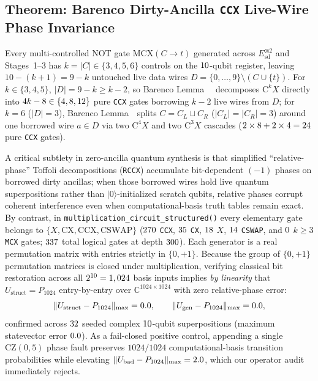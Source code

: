 \documentclass[aps,prx,twocolumn,superscriptaddress,nofootinbib]{revtex4-2}
\begin{document}
\subsection{Theorem: Barenco Dirty-Ancilla \texttt{CCX} Live-Wire Phase Invariance}
Every multi-controlled NOT gate $\mathrm{MCX}(C \to t)$ generated across $E_{\mathrm{sd}}^{\otimes 2}$ and Stages~1--3 has $k = |C| \in \{3,4,5,6\}$ controls on the $10$-qubit register, leaving $10 - (k + 1) = 9 - k$ untouched live data wires $D = \{0,\dots,9\} \setminus (C \cup \{t\})$. For $k \in \{3,4,5\}$, $|D| = 9 - k \ge k - 2$, so Barenco Lemma~\btmBarencoLemmaSevenTwo~\cite{Barenco1995} decomposes $\mathrm{C}^k X$ directly into $4k - 8 \in \{4, 8, 12\}$ pure \texttt{CCX} gates borrowing $k - 2$ live wires from $D$; for $k = 6$ ($|D| = 3$), Barenco Lemma~\btmBarencoLemmaSevenThree\ splits $C = C_L \sqcup C_R$ ($|C_L| = |C_R| = 3$) around one borrowed wire $a \in D$ via two $\mathrm{C}^4 X$ and two $\mathrm{C}^3 X$ cascades ($2 \times 8 + 2 \times 4 = 24$ pure \texttt{CCX} gates).

A critical subtlety in zero-ancilla quantum synthesis is that simplified ``relative-phase'' Toffoli decompositions (\texttt{RCCX}) accumulate bit-dependent $(-1)$ phases on borrowed dirty ancillas; when those borrowed wires hold live quantum superpositions rather than $|0\rangle$-initialized scratch qubits, relative phases corrupt coherent interference even when computational-basis truth tables remain exact. By contrast, in \texttt{multiplication\_circuit\_structured()} every elementary gate belongs to $\{X, \mathrm{CX}, \mathrm{CCX}, \mathrm{CSWAP}\}$ ($270$ \texttt{CCX}, $35$ \texttt{CX}, $18$ $X$, $14$ \texttt{CSWAP}, and $0$ $k \ge 3$ \texttt{MCX} gates; $337$ total logical gates at depth $300$). Each generator is a real permutation matrix with entries strictly in $\{0,+1\}$. Because the group of $\{0,+1\}$ permutation matrices is closed under multiplication, verifying classical bit restoration across all $2^{10} = 1,024$ basis inputs implies \emph{by linearity} that $U_{\mathrm{struct}} = P_{1024}$ entry-by-entry over $\mathbb{C}^{1024 \times 1024}$ with zero relative-phase error:
\begin{equation}
  \|U_{\mathrm{struct}} - P_{1024}\|_{\max} = 0.0, \qquad
  \|U_{\mathrm{gen}} - P_{1024}\|_{\max} = 0.0,
  \label{eq:mul_unitary_exact}
\end{equation}
confirmed across $32$ seeded complex $10$-qubit superpositions (maximum statevector error $0.0$). As a fail-closed positive control, appending a single $\mathrm{CZ}(0,5)$ phase fault preserves $1024/1024$ computational-basis transition probabilities while elevating $\|U_{\mathrm{bad}} - P_{1024}\|_{\max} = 2.0$, which our operator audit immediately rejects.
\end{document}
